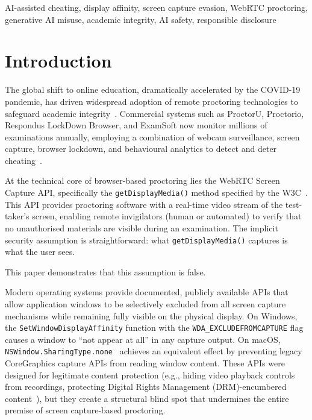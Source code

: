 \documentclass[conference]{IEEEtran}
\begin{document}
\begin{IEEEkeywords}
AI-assisted cheating, display affinity, screen capture evasion, WebRTC proctoring, generative AI misuse, academic integrity, AI safety, responsible disclosure
\end{IEEEkeywords}

\section{Introduction}

The global shift to online education, dramatically accelerated by the COVID-19 pandemic, has driven widespread adoption of remote proctoring technologies to safeguard academic integrity~\cite{lee2022online,noordegraaf2023ethical,khalil2022nexus}. Commercial systems such as ProctorU, Proctorio, Respondus LockDown Browser, and ExamSoft now monitor millions of examinations annually, employing a combination of webcam surveillance, screen capture, browser lockdown, and behavioural analytics to detect and deter cheating~\cite{balash2023educators,balash2021examining,johri2023students}.

At the technical core of browser-based proctoring lies the WebRTC Screen Capture API, specifically the \texttt{getDisplayMedia()} method specified by the W3C~\cite{bruaroey2025screen}. This API provides proctoring software with a real-time video stream of the test-taker's screen, enabling remote invigilators (human or automated) to verify that no unauthorised materials are visible during an examination. The implicit security assumption is straightforward: what \texttt{getDisplayMedia()} captures is what the user sees.

This paper demonstrates that this assumption is false.

Modern operating systems provide documented, publicly available APIs that allow application windows to be selectively excluded from all screen capture mechanisms while remaining fully visible on the physical display. On Windows, the \texttt{SetWindowDisplayAffinity} function with the \texttt{WDA\_EXCLUDEFROMCAPTURE} flag~\cite{microsoft2025setwindow} causes a window to ``not appear at all'' in any capture output. On macOS, \texttt{NSWindow.SharingType.none}~\cite{apple2025sharingtype} achieves an equivalent effect by preventing legacy CoreGraphics capture APIs from reading window content. These APIs were designed for legitimate content protection (e.g., hiding video playback controls from recordings, protecting Digital Rights Management (DRM)-encumbered content~\cite{dharminder2020lwedm}), but they create a structural blind spot that undermines the entire premise of screen capture-based proctoring.
\end{document}
